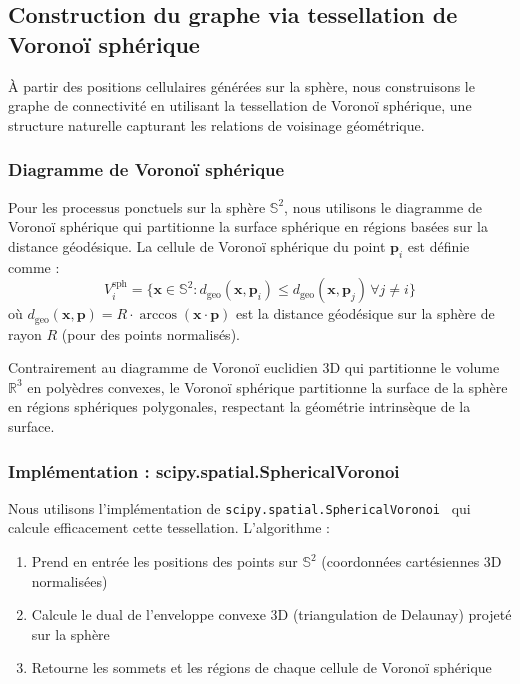 \subsection{Construction du graphe via tessellation de Voronoï sphérique}

À partir des positions cellulaires générées sur la sphère, nous construisons le graphe de connectivité en utilisant la tessellation de Voronoï sphérique, une structure naturelle capturant les relations de voisinage géométrique.

\subsubsection{Diagramme de Voronoï sphérique}

Pour les processus ponctuels sur la sphère $\mathbb{S}^2$, nous utilisons le diagramme de Voronoï sphérique qui partitionne la surface sphérique en régions basées sur la distance géodésique. La cellule de Voronoï sphérique du point $\mathbf{p}_i$ est définie comme :
\[
V_i^{\text{sph}} = \{\mathbf{x} \in \mathbb{S}^2 : d_{\text{geo}}(\mathbf{x}, \mathbf{p}_i) \leq d_{\text{geo}}(\mathbf{x}, \mathbf{p}_j) \, \forall j \neq i\}
\]
où $d_{\text{geo}}(\mathbf{x}, \mathbf{p}) = R \cdot \arccos(\mathbf{x} \cdot \mathbf{p})$ est la distance géodésique sur la sphère de rayon $R$ (pour des points normalisés).

Contrairement au diagramme de Voronoï euclidien 3D qui partitionne le volume $\mathbb{R}^3$ en polyèdres convexes, le Voronoï sphérique partitionne la surface de la sphère en régions sphériques polygonales, respectant la géométrie intrinsèque de la surface.

\subsubsection{Implémentation : scipy.spatial.SphericalVoronoi}

Nous utilisons l'implémentation de \texttt{scipy.spatial.SphericalVoronoi}~\cite{scipy} qui calcule efficacement cette tessellation. L'algorithme :
\begin{enumerate}
    \item Prend en entrée les positions des points sur $\mathbb{S}^2$ (coordonnées cartésiennes 3D normalisées)
    \item Calcule le dual de l'enveloppe convexe 3D (triangulation de Delaunay) projeté sur la sphère
    \item Retourne les sommets et les régions de chaque cellule de Voronoï sphérique
\end{enumerate}

